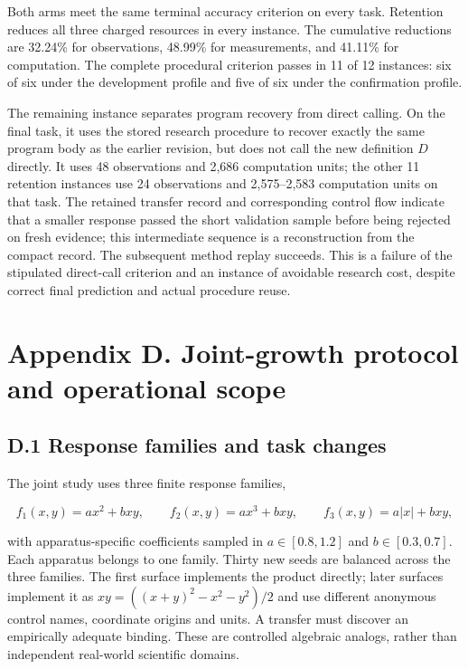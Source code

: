\documentclass[11pt,a4paper]{article}
\begin{document}
Both arms meet the same terminal accuracy criterion on every task. Retention reduces all three charged resources in every instance. The cumulative reductions are 32.24\% for observations, 48.99\% for measurements, and 41.11\% for computation. The complete procedural criterion passes in 11 of 12 instances: six of six under the development profile and five of six under the confirmation profile.


The remaining instance separates program recovery from direct calling. On the final task, it uses the stored research procedure to recover exactly the same program body as the earlier revision, but does not call the new definition \(D\) directly. It uses 48 observations and 2,686 computation units; the other 11 retention instances use 24 observations and 2,575–2,583 computation units on that task. The retained transfer record and corresponding control flow indicate that a smaller response passed the short validation sample before being rejected on fresh evidence; this intermediate sequence is a reconstruction from the compact record. The subsequent method replay succeeds. This is a failure of the stipulated direct-call criterion and an instance of avoidable research cost, despite correct final prediction and actual procedure reuse.


\section*{Appendix D. Joint-growth protocol and operational scope}

\subsection*{D.1 Response families and task changes}

The joint study uses three finite response families,


\[
f_1(x,y)=a x^2+bxy,\qquad
f_2(x,y)=a x^3+bxy,\qquad
f_3(x,y)=a|x|+bxy,
\]


with apparatus-specific coefficients sampled in \(a\in[0.8,1.2]\) and
\(b\in[0.3,0.7]\). Each apparatus belongs to one family. Thirty new seeds are
balanced across the three families. The first surface implements the product
directly; later surfaces implement it as
\(xy=((x+y)^2-x^2-y^2)/2\) and use different anonymous control names, coordinate
origins and units. A transfer must discover an empirically adequate binding.
These are controlled algebraic analogs, rather than independent real-world
scientific domains.
\end{document}
